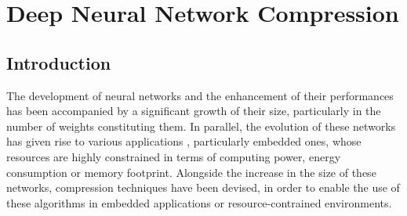 \chapter{Deep Neural Network Compression}
\label{chap:sota}

\localtableofcontents

\section{Introduction}\label{sec:sota:intro}

The development of neural networks and the enhancement of their performances has
been accompanied by a significant growth of their size, particularly in the
number of weights constituting them. In parallel, the evolution of these
networks has given rise to various applications
\cite{DBLP:conf/nips/KrizhevskySH12,DBLP:conf/emnlp/BudzianowskiV19,silver2018general,jumper2021highly},
particularly embedded ones\cite{kim2020review,kuutti2020survey}, whose resources
are highly constrained in terms of computing power, energy consumption or memory
footprint. Alongside the increase in the size of these networks, compression
techniques have been devised, in order to enable the use of these algorithms in
embedded applications or resource-contrained environments.\\

